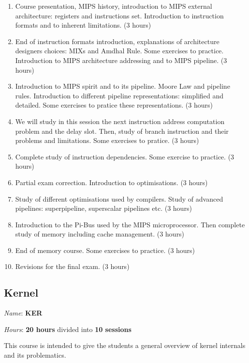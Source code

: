 \begin{multicols}{2}
\begin{enumerate}
  \item
    Course presentation, MIPS history, introduction to MIPS external
    architecture: registers and instructions set. Introduction to
    instruction formats and to inherent limitations. (3 hours)
  \item
    End of instruction formats introduction, explanations of architecture
    designers choices: MIXs and Amdhal Rule. Some exercises to practice.
    Introduction to MIPS architecture addressing and to MIPS pipeline.
    (3 hours)
  \item
    Introduction to MIPS spirit and to its pipeline. Moore Law and
    pipeline rules. Introduction to different pipeline representations:
    simplified and detailed. Some exercises to pratice these representations.
    (3 hours)
  \item
    We will study in this session the next instruction address computation
    problem and the delay slot. Then, study of branch instruction and their
    problems and limitations. Some exercises to pratice. (3 hours)
  \item
    Complete study of instruction dependencies. Some exercise to practice.
    (3 hours)
  \item
    Partial exam correction. Introduction to optimisations. (3 hours)
  \item
    Study of different optimisations used by compilers. Study of
    advanced pipelines: superpipeline, superscalar pipelines etc. (3 hours)
  \item
    Introduction to the Pi-Bus used by the MIPS microprocessor. Then complete
    study of memory including cache management. (3 hours)
  \item
    End of memory course. Some exercises to practice. (3 hours)
  \item
    Revisions for the final exam. (3 hours)
\end{enumerate}

%
%

\subsection{Kernel}

\textit{Name}: \textbf{KER}

\textit{Hours}: \textbf{20 hours} divided into \textbf{10 sessions}

This course is intended to give the students a general overview of
kernel internals and its problematics.


\end{multicols}
